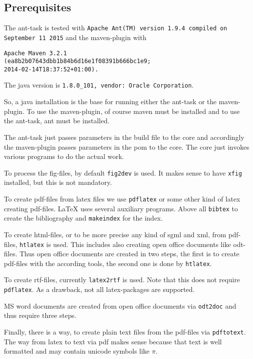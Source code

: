 \documentclass[12pt]{article}
\begin{document}
\subsection{Prerequisites}\label{subsec:prerequisites}

The ant-task is tested with 
{\tt Apache Ant(TM) version 1.9.4 compiled on September 11 2015}
and the maven-plugin with 
%
\begin{verbatim}
Apache Maven 3.2.1
(ea8b2b07643dbb1b84b6d16e1f08391b666bc1e9; 
2014-02-14T18:37:52+01:00). 
\end{verbatim}
The java version is {\tt 1.8.0\_101, vendor: Oracle Corporation}. 

So, a java installation is the base for running either the ant-task 
or the maven-plugin. 
To use the maven-plugin, of course maven must be installed 
and to use the ant-task, ant must be installed. 

The ant-task just passes parameters in the build file to the core 
and accordingly the maven-plugin passes parameters in the pom 
to the core. 
The core just invokes various programs to do the actual work. 

To process the fig-files, by default {\tt fig2dev} is used. 
It makes sense to have {\tt xfig} installed, but this is not mandatory. 

To create pdf-files from latex files we use {\tt pdflatex} 
or some other kind of latex creating pdf-files. 
LaTeX uses several auxiliary programs. 
Above all {\tt bibtex} to create the bibliography 
and {\tt makeindex} for the index. 

To create html-files, or to be more precise any kind of sgml and xml, 
from pdf-files, {\tt htlatex} is used. 
This includes also creating open office documents like odt-files. 
Thus open office documents are created in two steps, 
the first is to create pdf-files with the according tools, 
the second one is done by {\tt htlatex}. 

To create rtf-files, currently {\tt latex2rtf} is used. 
Note that this does not require {\tt pdflatex}. 
As a drawback, not all latex-packages are supported. 

MS word documents are created from open office documents via {\tt odt2doc} 
and thus require three steps. 

Finally, there is a way, to create plain text files from the pdf-files 
via {\tt pdftotext}. 
The way from latex to text via pdf makes sense 
because that text is well formatted 
and may contain unicode symbols like $\pi$. 
\end{document}
